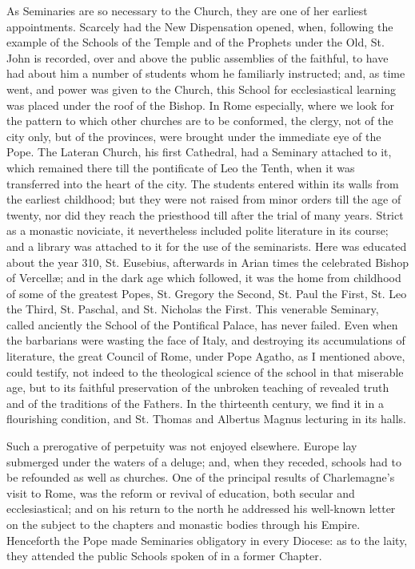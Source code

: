 As Seminaries are so necessary
to the Church, they are one of her earliest appointments. Scarcely had
the New Dispensation opened, when, following the example of the
Schools of the Temple and of the Prophets under the Old, St. John is
recorded, over and above the public assemblies of the faithful, to
have had about him a number of students whom he familiarly instructed;
and, as time went, and power was given to the Church, this School for
ecclesiastical learning was placed under the roof of the Bishop. In
Rome especially, where we look for the pattern to which other churches
are to be conformed, the clergy, not of the city only, but of the
provinces, were brought under the immediate eye of the Pope. The
Lateran Church, his first Cathedral, had a Seminary attached to it,
which remained there till the pontificate of Leo the Tenth, when it
was transferred into the heart of the city. The students entered
within its walls from the earliest childhood; but they were not raised
from minor orders till the age of twenty, nor did they reach the
priesthood till after the trial of many years. Strict as a monastic
noviciate, it nevertheless included polite literature in its course;
and a library was attached to it for the use of the seminarists. Here
was educated about the year 310, St. Eusebius, afterwards in Arian
times the celebrated Bishop of Vercellæ; and in the dark age which
followed, it was the home from childhood of some of the greatest
Popes, St. Gregory the Second, St. Paul the First, St. Leo the Third,
St. Paschal, and St. Nicholas the First. This venerable Seminary,
called anciently the School of the Pontifical Palace, has never
failed. Even when the barbarians were wasting the face of Italy, and
destroying its accumulations of literature, the great Council of Rome,
under Pope Agatho, as I mentioned above, could testify, not indeed to the theological science of the school in that miserable age,
but to its faithful preservation of the unbroken teaching of revealed
truth and of the traditions of the Fathers. In the thirteenth century,
we find it in a flourishing condition, and St. Thomas and Albertus
Magnus lecturing in its halls.

Such a prerogative of
perpetuity was not enjoyed elsewhere. Europe lay submerged under the
waters of a deluge; and, when they receded, schools had to be
refounded as well as churches. One of the principal results of
Charlemagne's visit to Rome, was the reform or revival of education,
both secular and ecclesiastical; and on his return to the north he
addressed his well-known letter on the subject to the chapters and
monastic bodies through his Empire. Henceforth the Pope made
Seminaries obligatory in every Diocese: as to the laity, they attended
the public Schools spoken of in a former Chapter.

